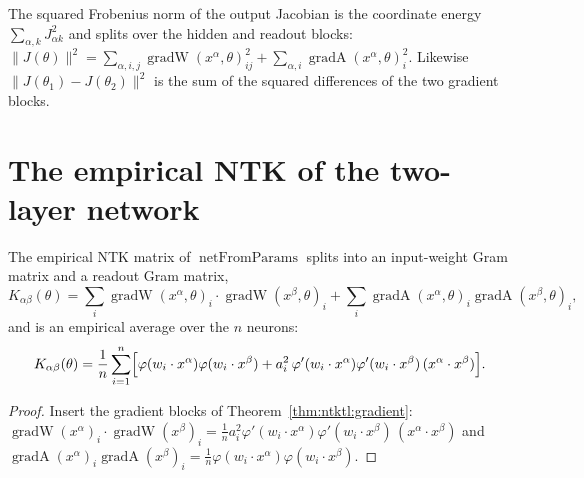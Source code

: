\begin{lemma}\label{lem:ntktl:jacobianNorm}
  \leanok
The squared Frobenius norm of the output Jacobian is the coordinate energy $\sum_{\alpha,k}J_{\alpha k}^2$ and splits over the hidden and readout blocks:
$\|J(\theta)\|^2=\sum_{\alpha,i,j}\operatorname{gradW}(x^\alpha,\theta)_{ij}^2+\sum_{\alpha,i}\operatorname{gradA}(x^\alpha,\theta)_i^2$. Likewise
$\|J(\theta_1)-J(\theta_2)\|^2$ is the sum of the squared differences of the two gradient blocks.
\end{lemma}


\section{The empirical NTK of the two-layer network}\label{sec:ntktl:ntk}

\begin{theorem}\label{thm:ntktl:neuronSum}
  \leanok
The empirical NTK matrix of $\operatorname{netFromParams}$ splits into an input-weight Gram matrix and a readout Gram matrix,
\[
  K_{\alpha\beta}(\theta)=\sum_i\operatorname{gradW}(x^\alpha,\theta)_i\cdot\operatorname{gradW}(x^\beta,\theta)_i+\sum_i\operatorname{gradA}(x^\alpha,\theta)_i\operatorname{gradA}(x^\beta,\theta)_i,
\]
and is an empirical average over the $n$ neurons:
\[
  K_{\alpha\beta}(\theta)=\frac1n\sum_{i=1}^n\Bigl[\varphi(w_i\cdot x^\alpha)\varphi(w_i\cdot x^\beta)+a_i^2\,\varphi'(w_i\cdot x^\alpha)\varphi'(w_i\cdot x^\beta)\,(x^\alpha\cdot x^\beta)\Bigr].
\]
\end{theorem}

\begin{proof}
  \leanok
Insert the gradient blocks of Theorem~\ref{thm:ntktl:gradient}: $\operatorname{gradW}(x^\alpha)_i\cdot\operatorname{gradW}(x^\beta)_i=\frac1na_i^2\varphi'(w_i\cdot x^\alpha)\varphi'(w_i\cdot x^\beta)\,(x^\alpha\cdot x^\beta)$ and
$\operatorname{gradA}(x^\alpha)_i\operatorname{gradA}(x^\beta)_i=\frac1n\varphi(w_i\cdot x^\alpha)\varphi(w_i\cdot x^\beta)$.
\end{proof}

